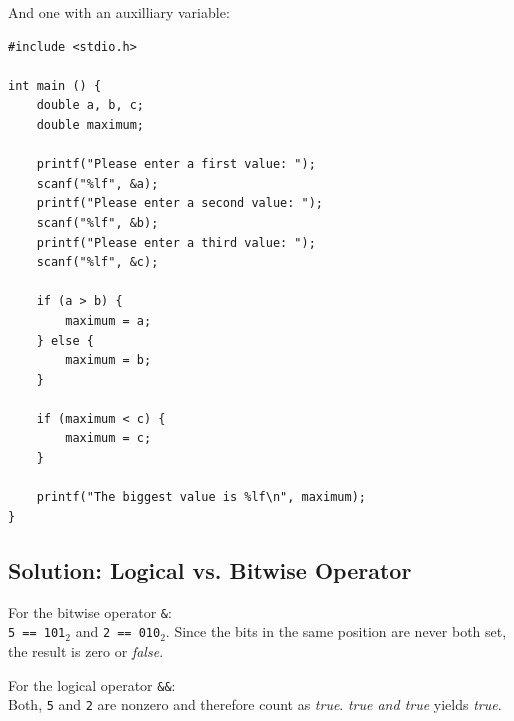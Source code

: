 And one with an auxilliary variable:
\begin{codebox}[exo5-2b.c]
\begin{verbatim}
#include <stdio.h>

int main () {
    double a, b, c;
    double maximum;
    
    printf("Please enter a first value: ");
    scanf("%lf", &a);
    printf("Please enter a second value: ");
    scanf("%lf", &b);
    printf("Please enter a third value: ");
    scanf("%lf", &c);
    
    if (a > b) {
        maximum = a;
    } else {
        maximum = b;
    }
    
    if (maximum < c) {
        maximum = c;
    }
    
    printf("The biggest value is %lf\n", maximum);
}
\end{verbatim}
\end{codebox}


\subsection*{Solution: Logical vs. Bitwise Operator}
For the bitwise operator \texttt{\&}:\\
\texttt{5 == 101$_2$} and \texttt{2 == 010$_2$}. Since the bits in the same position are never both set, the result is zero or \emph{false}.

For the logical operator \texttt{\&\&}:\\
Both, \texttt{5} and \texttt{2} are nonzero and therefore count as \emph{true}. \emph{true and true} yields \emph{true}.


